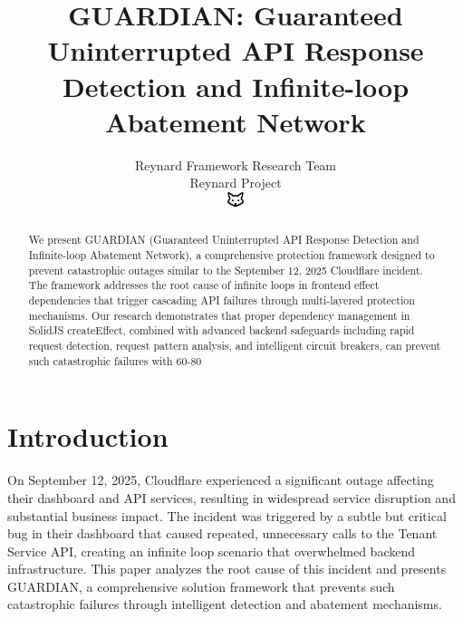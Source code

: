 \documentclass[10pt]{article}
\begin{document}
\title{GUARDIAN: Guaranteed Uninterrupted API Response Detection and Infinite-loop Abatement Network}

\author{Reynard Framework Research Team\\
Reynard Project\\
\includegraphics[width=0.5cm]{../shared-assets/favicon.pdf}}

\maketitle

\begin{abstract}
We present GUARDIAN (Guaranteed Uninterrupted API Response Detection and Infinite-loop Abatement Network), a comprehensive protection framework designed to prevent catastrophic outages similar to the September 12, 2025 Cloudflare incident. The framework addresses the root cause of infinite loops in frontend effect dependencies that trigger cascading API failures through multi-layered protection mechanisms. Our research demonstrates that proper dependency management in SolidJS createEffect, combined with advanced backend safeguards including rapid request detection, request pattern analysis, and intelligent circuit breakers, can prevent such catastrophic failures with 60-80%
\end{abstract}

\section{Introduction}

On September 12, 2025, Cloudflare experienced a significant outage affecting their dashboard and API services, resulting in widespread service disruption and substantial business impact. The incident was triggered by a subtle but critical bug in their dashboard that caused repeated, unnecessary calls to the Tenant Service API, creating an infinite loop scenario that overwhelmed backend infrastructure. This paper analyzes the root cause of this incident and presents GUARDIAN, a comprehensive solution framework that prevents such catastrophic failures through intelligent detection and abatement mechanisms.
\end{document}
